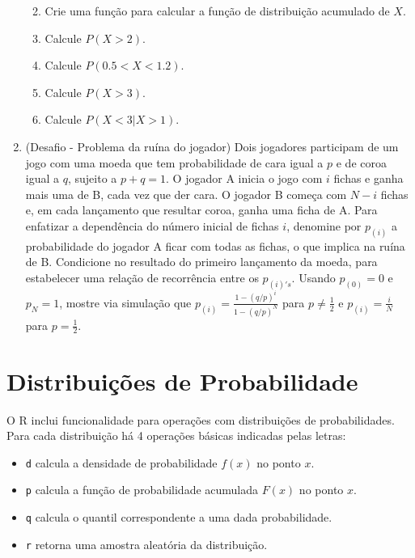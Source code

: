 \documentclass[
  10pt,
  a4paper]{book}
\providecommand{\tightlist}{%
  \setlength{\itemsep}{0pt}\setlength{\parskip}{0pt}}
\begin{document}
\begin{enumerate}
  \begin{enumerate}
  \def\labelenumii{\alph{enumii}.}
  \tightlist
  \item
    Crie uma função para calcular a função de distribuição acumulado de \(X\).
  \item
    Calcule \(P(X > 2)\).
  \item
    Calcule \(P(0.5 < X < 1.2)\).
  \item
    Calcule \(P(X > 3)\).
  \item
    Calcule \(P(X < 3| X > 1)\).
  \end{enumerate}
\item
  (Desafio - Problema da ruína do jogador) Dois jogadores participam de um jogo com uma moeda que tem probabilidade de cara igual a \(p\) e de coroa igual a \(q\), sujeito a \(p+q=1\). O jogador A inicia o jogo com \(i\) fichas e ganha mais uma de B, cada vez que der cara. O jogador B começa com \(N-i\) fichas e, em cada lançamento que resultar coroa, ganha uma ficha de A. Para enfatizar a dependência do número inicial de fichas \(i\), denomine por \(p_{(i)}\) a probabilidade do jogador A ficar com todas as fichas, o que implica na ruína de B. Condicione no resultado do primeiro lançamento da moeda, para estabelecer uma relação de recorrência entre os \(p_{(i)'s}\). Usando \(p_{(0)} = 0\) e \(p_{N} = 1\), mostre via simulação que \(p_{(i)} = \frac{1-(q/p)^i}{1-(q/p)^N}\) para \(p \neq \frac{1}{2}\) e \(p_{(i)} = \frac{i}{N}\) para \(p = \frac{1}{2}\).
\end{enumerate}

\hypertarget{distribuiuxe7uxf5es-de-probabilidade}{%
\section{Distribuições de Probabilidade}\label{distribuiuxe7uxf5es-de-probabilidade}}

O R inclui funcionalidade para operações com distribuições de
probabilidades. Para cada distribuição há 4 operações básicas indicadas
pelas letras:

\begin{itemize}
\tightlist
\item
  \texttt{d} calcula a densidade de probabilidade \(f(x)\) no ponto \(x\).
\item
  \texttt{p} calcula a função de probabilidade acumulada \(F(x)\) no ponto \(x\).
\item
  \texttt{q} calcula o quantil correspondente a uma dada probabilidade.
\item
  \texttt{r} retorna uma amostra aleatória da distribuição.
\end{itemize}
\end{document}
